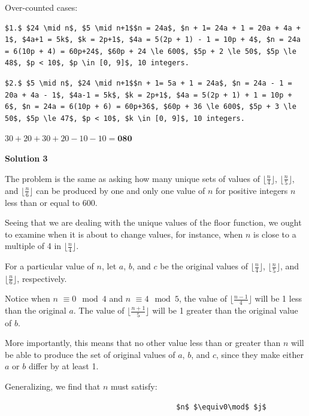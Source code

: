\begin{enumerate}
Over-counted cases:

 \begin{verbatim}
$1.$ $24 \mid n$, $5 \mid n+1$$n = 24a$, $n + 1= 24a + 1 = 20a + 4a + 1$, $4a+1 = 5k$, $k = 2p+1$, $4a = 5(2p + 1) - 1 = 10p + 4$, $n = 24a = 6(10p + 4) = 60p+24$, $60p + 24 \le 600$, $5p + 2 \le 50$, $5p \le 48$, $p < 10$, $p \in [0, 9]$, 10 integers.
\end{verbatim}

\begin{verbatim}
$2.$ $5 \mid n$, $24 \mid n+1$$n + 1= 5a + 1 = 24a$, $n = 24a - 1 = 20a + 4a - 1$, $4a-1 = 5k$, $k = 2p+1$, $4a = 5(2p + 1) + 1 = 10p + 6$, $n = 24a = 6(10p + 6) = 60p+36$, $60p + 36 \le 600$, $5p + 3 \le 50$, $5p \le 47$, $p < 10$, $k \in [0, 9]$, 10 integers.
\end{verbatim}

$30 + 20 + 30 + 20 - 10 - 10 = \boxed{\textbf{080}}$




\textbf{Solution 3}

The problem is the same as asking how many unique sets of values of $\lfloor\frac{n}{4}\rfloor$, $\lfloor\frac{n}{5}\rfloor$, and $\lfloor\frac{n}{6}\rfloor$ can be produced by one and only one value of $n$ for positive integers $n$ less than or equal to 600.

 Seeing that we are dealing with the unique values of the floor function, we ought to examine when it is about to change values, for instance, when $n$ is close to a multiple of 4 in $\lfloor\frac{n}{4}\rfloor$.

 For a particular value of $n$, let $a$, $b$, and $c$ be the original values of $\lfloor\frac{n}{4}\rfloor$, $\lfloor\frac{n}{5}\rfloor$, and $\lfloor\frac{n}{6}\rfloor$, respectively.

 Notice when $n$ $\equiv0\mod4$ and $n$ $\equiv4\mod5$, the value of $\lfloor\frac{n-1}{4}\rfloor$ will be 1 less than the original $a$. The value of $\lfloor\frac{n+1}{5}\rfloor$ will be 1 greater than the original value of $b$.

 More importantly, this means that no other value less than or greater than $n$ will be able to produce the set of original values of $a$, $b$, and $c$, since they make either $a$ or $b$ differ by at least 1.

 
Generalizing, we find that $n$ must satisfy:

 \begin{verbatim}
										$n$ $\equiv0\mod$ $j$
\end{verbatim}


\end{enumerate}
